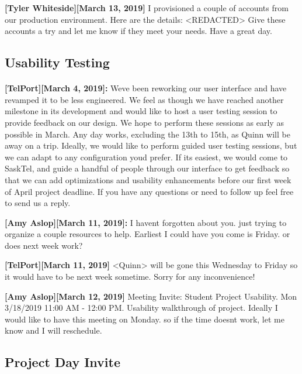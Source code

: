 \documentclass[12pt]{article}
\begin{document}
\textbf{[Tyler Whiteside][March 13, 2019]} I provisioned a couple of accounts from our production environment.  Here are the details: <REDACTED> Give these accounts a try and let me know if they meet your needs. Have a great day.

\subsection{Usability Testing}

\paragraph{}
\textbf{[TelPort][March 4, 2019]:} Weve been reworking our user interface and have revamped it to be less engineered. We feel as though we have reached another milestone in its development and would like to host a user testing session to provide feedback on our design. We hope to perform these sessions as early as possible in March. Any day works, excluding the 13th to 15th, as Quinn will be away on a trip.
Ideally, we would like to perform guided user testing sessions, but we can adapt to any configuration youd prefer. If its easiest, we would come to SaskTel, and guide a handful of people through our interface to get feedback so that we can add optimizations and usability enhancements before our first week of April project deadline. If you have any questions or need to follow up feel free to send us a reply.

\textbf{[Amy Aslop][March 11, 2019]:} I havent forgotten about you. just trying to organize a couple resources to help. Earliest I could have you come is Friday. or does next week work?

\textbf{[TelPort][March 11, 2019]} <Quinn> will be gone this Wednesday to Friday so it would have to be next week sometime. Sorry for any inconvenience!

\textbf{[Amy Aslop][March 12, 2019]} Meeting Invite: Student Project Usability. Mon 3/18/2019 11:00 AM - 12:00 PM. Usability walkthrough of project. Ideally I would like to have this meeting on Monday. so if the time doesnt work, let me know and I will reschedule.

\subsection{Project Day Invite}
\end{document}
